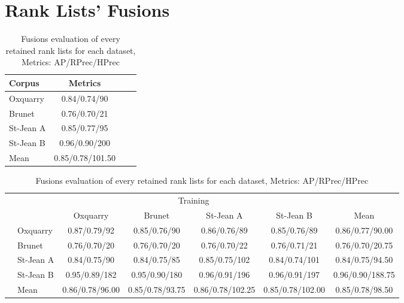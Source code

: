 \section{Rank Lists' Fusions}

\begin{table}[H]
  \centering
  \caption{Fusions evaluation of every retained rank lists for each dataset, Metrics: AP/RPrec/HPrec}
  \label{tab:fusions_scores}

  \begin{tabular}{l c c c}
    \toprule
    Corpus         & Metrics \\
    \midrule
    Oxquarry       & 0.84/0.74/90 \\
    Brunet         & 0.76/0.70/21 \\
    St-Jean A      & 0.85/0.77/95 \\
    St-Jean B      & 0.96/0.90/200 \\
    \midrule
    Mean           & 0.85/0.78/101.50 \\
    \bottomrule
  \end{tabular}

  \vspace{0.5cm}

  \begin{tabular}{l l| c c c c|c}
    \toprule
    \multicolumn{2}{c}{\multirow{2}{*}{}} & \multicolumn{4}{c}{Training} \\
    \multicolumn{2}{c}{} & Oxquarry & Brunet & St-Jean A & St-Jean B & Mean \\
    \midrule
    \parbox[t]{2mm}{}
    & Oxquarry  & 0.87/0.79/92 & 0.85/0.76/90 & 0.86/0.76/89 & 0.85/0.76/89 & 0.86/0.77/90.00 \\
    & Brunet    & 0.76/0.70/20 & 0.76/0.70/20 & 0.76/0.70/22 & 0.76/0.71/21 & 0.76/0.70/20.75 \\
    & St-Jean A & 0.84/0.75/90 & 0.84/0.75/85 & 0.85/0.75/102 & 0.84/0.74/101 & 0.84/0.75/94.50 \\
    & St-Jean B & 0.95/0.89/182 & 0.95/0.90/180 & 0.96/0.91/196 & 0.96/0.91/197 & 0.96/0.90/188.75 \\
    \midrule
    & Mean      & 0.86/0.78/96.00 & 0.85/0.78/93.75 & 0.86/0.78/102.25 & 0.85/0.78/102.00 & 0.85/0.78/98.50 \\
    \bottomrule
  \end{tabular}

\end{table}
